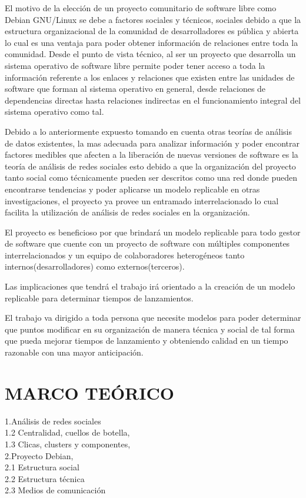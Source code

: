 \documentclass[12pt]{report}
\begin{document}
El motivo de la elección de  un proyecto comunitario de software libre
como Debian GNU/Linux se debe a factores sociales y técnicos, sociales
debido  a  que  la  estructura   organizacional  de  la  comunidad  de
desarrolladores es pública y abierta lo cual es una ventaja para poder
obtener información  de relaciones entre  toda la comunidad.  Desde el
punto de vista  técnico, al ser un proyecto que  desarrolla un sistema
operativo  de software  libre permite  poder  tener acceso  a toda  la
información referente a los enlaces y relaciones que existen entre las
unidades de software que forman al sistema operativo en general, desde
relaciones de dependencias directas  hasta relaciones indirectas en el
funcionamiento integral del sistema operativo como tal.

Debido a lo anteriormente expuesto  tomando en cuenta otras teorías de
análisis  de   datos  existentes,   la  mas  adecuada   para  analizar
información  y poder  encontrar  factores medibles  que  afecten a  la
liberación de nuevas versiones de software es la teoría de análisis de
redes sociales  esto debido a  que la organización del  proyecto tanto
social  como técnicamente  pueden  ser descritos  como  una red  donde
pueden encontrarse  tendencias y poder aplicarse  un modelo replicable
en  otras   investigaciones,  el  proyecto  ya   provee  un  entramado
interrelacionado lo cual facilita la  utilización de análisis de redes
sociales en la organización.

El proyecto es beneficioso por  que brindará un modelo replicable para
todo gestor  de software que  cuente con  un proyecto de  software con
múltiples componentes  interrelacionados y un equipo  de colaboradores
heterogéneos tanto internos(desarrolladores) como externos(terceros).

Las implicaciones que tendrá el trabajo irá orientado a la creación de
un modelo replicable para determinar tiempos de lanzamientos.

El trabajo va dirigido a toda  persona que necesite modelos para poder
determinar que puntos modificar en su organización de manera técnica y
social  de  tal forma  que  pueda  mejorar  tiempos de  lanzamiento  y
obteniendo calidad en un tiempo razonable con una mayor anticipación.

\chapter*{MARCO TEÓRICO}

1.Análisis de redes  sociales \\ 
1.2 Centralidad,  cuellos de botella,\\ 
1.3  Clicas, clusters y  componentes, \\ 
2.Proyecto Debian,  \\ 
2.1 Estructura  social  \\  
2.2  Estructura   técnica  \\  
2.3  Medios  de comunicación \\
\end{document}
